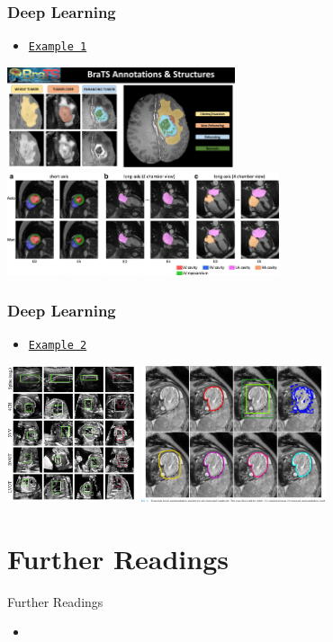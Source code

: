 \begin{frame}
    \frametitle{Deep Learning}
    \begin{itemize}
        \item \href{https://www.youtube.com/watch?v=81AvQQnpG4Q}{\texttt{Example 1}}
        \end{itemize}
        \begin{center}
    \includegraphics[height=3cm]{img/brats-tumor-subregions.jpg}
    \includegraphics[height=3cm]{img/cardiac.png}
     \end{center}
\end{frame}

\begin{frame}
    \frametitle{Deep Learning}
    \begin{itemize}
        \item \href{https://www.youtube.com/watch?v=4V8V0jF0zFc}{\texttt{Example 2}}
        \end{itemize}
        \begin{center}
    \includegraphics[height=4cm]{img/ultrasound.png}
    \includegraphics[height=4cm]{img/fetal.png}
     \end{center}
\end{frame}

\section{Further Readings}%
\label{sec:further_readings}


\begin{frame}[t]{Further Readings}
    \begin{itemize}
        \item {}
    \end{itemize}
\end{frame}




